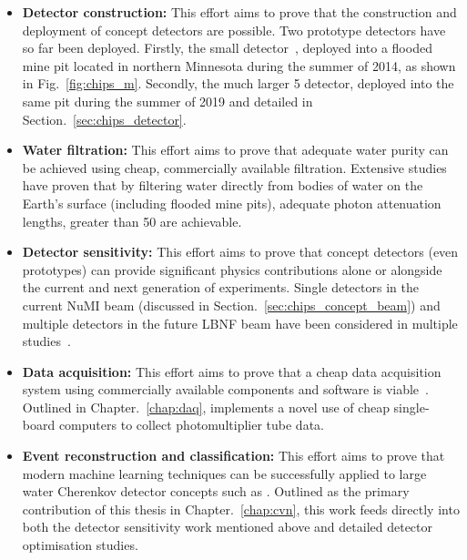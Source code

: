 \begin{itemize}
    \item \textbf{Detector construction:} This effort aims to prove that the construction and
          deployment of \chips concept detectors are possible. Two prototype detectors have so far
          been deployed. Firstly, the small \chipsm detector~\cite{perch2015, pfutznerProto2017,
              pfutzner2017}, deployed into a flooded mine pit located in northern Minnesota during the
          summer of 2014, as shown in Fig.~\ref{fig:chips_m}. Secondly, the much larger
          \unit{5}{} \chipsfive detector, deployed into the same pit during the summer
          of 2019 and detailed in Section.~\ref{sec:chips_detector}.

    \item \textbf{Water filtration:} This effort aims to prove that adequate water purity can be
          achieved using cheap, commercially available filtration. Extensive
          studies~\cite{amat2017, campbell2020} have proven that by filtering water directly from
          bodies of water on the Earth's surface (including flooded mine pits), adequate photon
          attenuation lengths, greater than \unit{50}{} are achievable.

    \item \textbf{Detector sensitivity:} This effort aims to prove that \chips concept detectors
          (even prototypes) can provide significant physics contributions alone or alongside the
          current and next generation of experiments. Single detectors in the current NuMI beam
          (discussed in Section.~\ref{sec:chips_concept_beam}) and multiple detectors in the
          future LBNF beam have been considered in multiple studies~\cite{pfutzner2017, adde2016,
              lang2015}.

    \item \textbf{Data acquisition:} This effort aims to prove that a cheap data acquisition
          system using commercially available components and software is viable~\cite{eijk2018}.
          Outlined in Chapter.~\ref{chap:daq}, \chips implements a novel use of cheap single-board
          computers to collect photomultiplier tube data.

    \item \textbf{Event reconstruction and classification:} This effort aims to prove that modern
          machine learning techniques can be successfully applied to large water Cherenkov
          detector concepts such as \chips. Outlined as the primary contribution of this thesis in
          Chapter.~\ref{chap:cvn}, this work feeds directly into both the detector sensitivity
          work mentioned above and detailed detector optimisation studies.
\end{itemize}

